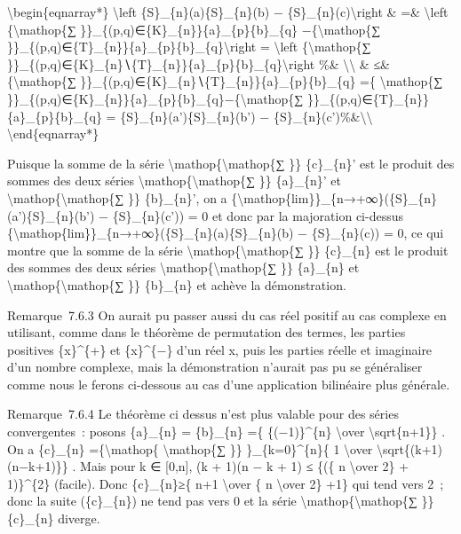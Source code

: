 \documentclass[]{article}
\begin{document}
\textbackslash{}begin\{eqnarray*\} \textbackslash{}left
\textbar{}\{S\}\_\{n\}(a)\{S\}\_\{n\}(b) −
\{S\}\_\{n\}(c)\textbackslash{}right \textbar{}\& =\&
\textbackslash{}left \textbar{}\{\textbackslash{}mathop\{∑
\}\}\_\{(p,q)∈\{K\}\_\{n\}\}\{a\}\_\{p\}\{b\}\_\{q\}
−\{\textbackslash{}mathop\{∑
\}\}\_\{(p,q)∈\{T\}\_\{n\}\}\{a\}\_\{p\}\{b\}\_\{q\}\textbackslash{}right
\textbar{} = \textbackslash{}left \textbar{}\{\textbackslash{}mathop\{∑
\}\}\_\{(p,q)∈\{K\}\_\{n\}∖\{T\}\_\{n\}\}\{a\}\_\{p\}\{b\}\_\{q\}\textbackslash{}right
\textbar{} \%\& \textbackslash{}\textbackslash{} \& ≤\&
\{\textbackslash{}mathop\{∑
\}\}\_\{(p,q)∈\{K\}\_\{n\}∖\{T\}\_\{n\}\}\textbar{}\{a\}\_\{p\}\textbar{}\textbar{}\{b\}\_\{q\}\textbar{}
=\{ \textbackslash{}mathop\{∑
\}\}\_\{(p,q)∈\{K\}\_\{n\}\}\textbar{}\{a\}\_\{p\}\textbar{}\textbar{}\{b\}\_\{q\}\textbar{}−\{\textbackslash{}mathop\{∑
\}\}\_\{(p,q)∈\{T\}\_\{n\}\}\textbar{}\{a\}\_\{p\}\textbar{}\textbar{}\{b\}\_\{q\}\textbar{}
= \{S\}\_\{n\}(a')\{S\}\_\{n\}(b') −
\{S\}\_\{n\}(c')\%\&\textbackslash{}\textbackslash{}
\textbackslash{}end\{eqnarray*\}

Puisque la somme de la série
\textbackslash{}mathop\{\textbackslash{}mathop\{∑ \}\} \{c\}\_\{n\}' est
le produit des sommes des deux séries
\textbackslash{}mathop\{\textbackslash{}mathop\{∑ \}\} \{a\}\_\{n\}' et
\textbackslash{}mathop\{\textbackslash{}mathop\{∑ \}\} \{b\}\_\{n\}', on
a
\{\textbackslash{}mathop\{lim\}\}\_\{n→+∞\}(\{S\}\_\{n\}(a')\{S\}\_\{n\}(b')
− \{S\}\_\{n\}(c')) = 0 et donc par la majoration ci-dessus
\{\textbackslash{}mathop\{lim\}\}\_\{n→+∞\}(\{S\}\_\{n\}(a)\{S\}\_\{n\}(b)
− \{S\}\_\{n\}(c)) = 0, ce qui montre que la somme de la série
\textbackslash{}mathop\{\textbackslash{}mathop\{∑ \}\} \{c\}\_\{n\} est
le produit des sommes des deux séries
\textbackslash{}mathop\{\textbackslash{}mathop\{∑ \}\} \{a\}\_\{n\} et
\textbackslash{}mathop\{\textbackslash{}mathop\{∑ \}\} \{b\}\_\{n\} et
achève la démonstration.

Remarque~7.6.3 On aurait pu passer aussi du cas réel positif au cas
complexe en utilisant, comme dans le théorème de permutation des termes,
les parties positives \{x\}\^{}\{+\} et \{x\}\^{}\{−\} d'un réel x, puis
les parties réelle et imaginaire d'un nombre complexe, mais la
démonstration n'aurait pas pu se généraliser comme nous le ferons
ci-dessous au cas d'une application bilinéaire plus générale.

Remarque~7.6.4 Le théorème ci dessus n'est plus valable pour des séries
convergentes~: posons \{a\}\_\{n\} = \{b\}\_\{n\} =\{ \{(−1)\}\^{}\{n\}
\textbackslash{}over \textbackslash{}sqrt\{n+1\}\} . On a
\textbar{}\{c\}\_\{n\}\textbar{} =\{\textbackslash{}mathop\{
\textbackslash{}mathop\{∑ \}\} \}\_\{k=0\}\^{}\{n\}\{ 1
\textbackslash{}over \textbackslash{}sqrt\{(k+1)(n−k+1)\}\} . Mais pour
k ∈ {[}0,n{]}, (k + 1)(n − k + 1) ≤ \{(\{ n \textbackslash{}over 2\} +
1)\}\^{}\{2\} (facile). Donc \textbar{}\{c\}\_\{n\}\textbar{}≥\{ n+1
\textbackslash{}over \{ n \textbackslash{}over 2\} +1\} qui tend vers
2~; donc la suite (\{c\}\_\{n\}) ne tend pas vers 0 et la série
\textbackslash{}mathop\{\textbackslash{}mathop\{∑ \}\} \{c\}\_\{n\}
diverge.
\end{document}

